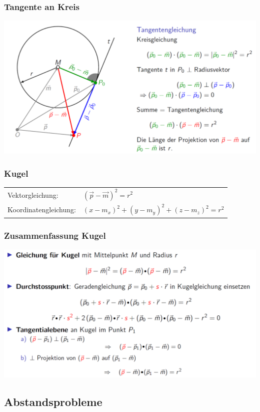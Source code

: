 			\subsubsection{Tangente an Kreis}
			\includegraphics[width=0.8\linewidth]{Bilder/kreis-tangente}	
			
			
			\subsubsection{Kugel}
			\begin{tabular}{ll}
			Vektorgleichung: & $(\vec{p} - \vec{m})^2 = r^2$\\
			Koordinatengleichung: & $(x - m_x)^2 + (y - m_y)^2 + (z - m_z)^2 = r^2$\\
			\end{tabular}
			
			\subsubsection{Zusammenfassung Kugel}
			\includegraphics[width=0.8\linewidth]{Bilder/kugel}	
			
			
			\vfill\null
			\columnbreak	
			
			
			
			\subsection{Abstandsprobleme}
		
